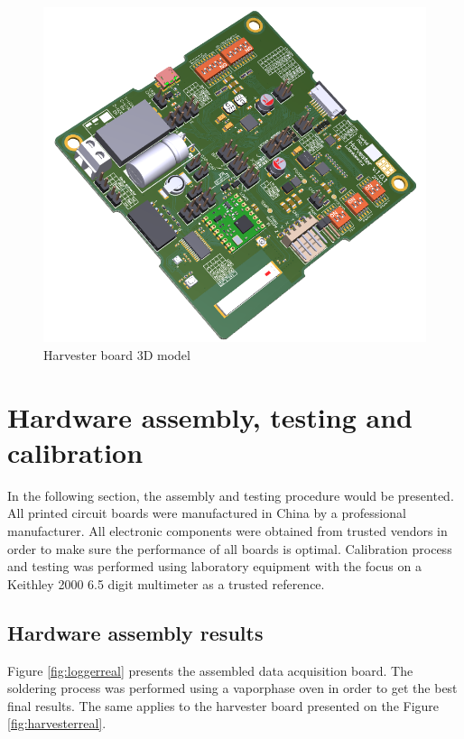 \documentclass[12pt,a4paper]{article}
\begin{document}
\begin{figure}[ht!]
\includegraphics[scale=0.75]{harvester2.png}
\caption{Harvester board 3D model}
\label{fig:harvester3d}
\end{figure}

\section{Hardware assembly, testing and calibration}

In the following section, the assembly and testing procedure would be presented. All printed circuit boards were manufactured in China by a professional manufacturer. All electronic components were obtained from trusted vendors in order to make sure the performance of all boards is optimal. Calibration process and testing was performed using laboratory equipment with the focus on a Keithley 2000 6.5 digit multimeter as a trusted reference. 

\subsection{Hardware assembly results}
Figure \ref{fig:loggerreal} presents the assembled data acquisition board. The soldering process was performed using a vaporphase oven in order to get the best final results. The same applies to the harvester board presented on the Figure \ref{fig:harvesterreal}. 
\par
\end{document}

